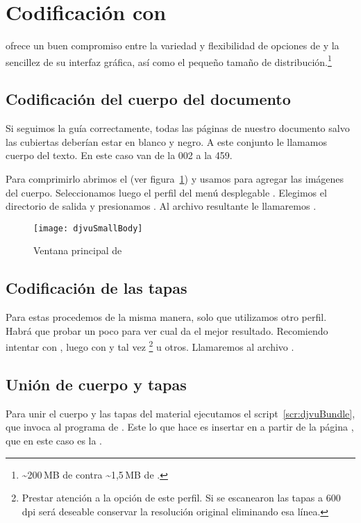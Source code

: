\documentclass[%
	a5paper,
	10pt,
	twoside,
	openright,
	final,
]{memoir}
\begin{document}
	\section{Codificación con \djvusmall\label{sec:djvuSmall}} \djvusmall ofrece un buen compromiso entre la variedad y flexibilidad de opciones de \dexpress y la sencillez de su interfaz gráfica, así como el pequeño tamaño de distribución.\footnote{\textasciitilde 200\,MB de \dexpress contra \textasciitilde 1,5\,MB de \djvusmall.}

	\subsection{Codificación del cuerpo del documento\label{sec:djvuSmallBody}} Si seguimos la guía correctamente, todas las páginas de nuestro documento salvo las cubiertas deberían estar en blanco y negro. A este conjunto le llamamos cuerpo del texto. En este caso van de la 002 a la 459.

	Para comprimirlo abrimos el \djvusmall (ver figura~\ref{fig:djvuSmallBody}) y usamos  para agregar las imágenes del cuerpo. Seleccionamos luego el perfil  del menú desplegable . Elegimos el directorio de salida y presionamos . Al archivo resultante le llamaremos .

	\begin{figure}
		\texttt{[image: djvuSmallBody]}
		\caption{Ventana principal de \djvusmall\label{fig:djvuSmallBody}}
	\end{figure}

	\subsection{Codificación de las tapas\label{sec:djvuSmallCovers}} Para estas procedemos de la misma manera, solo que utilizamos otro perfil. Habrá que probar un poco para ver cual da el mejor resultado. Recomiendo intentar con , luego con  y tal vez \footnote{Prestar atención a la opción  de este perfil. Si se escanearon las tapas a 600\,dpi será deseable conservar la resolución original eliminando esa línea.} u otros. Llamaremos al archivo .

	\subsection{Unión de cuerpo y tapas} Para unir el cuerpo y las tapas del material ejecutamos el script~\ref{scr:djvuBundle}, que invoca al programa  de \djvulibre. Este lo que hace es insertar  en  a partir de la página , que en este caso es la .
\end{document}
